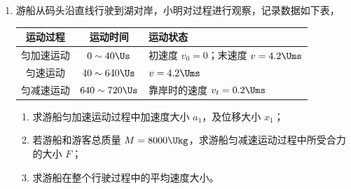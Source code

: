 \documentclass[\gkver]{gaokaozhenti}
\begin{document}
\begin{enumerate}
\item
游船从码头沿直线行驶到湖对岸，小明对过程进行观察，记录数据如下表，

\begin{center}
\begin{tabular}{|c|c|l|}
\hline
运动过程 & 运动时间 & 运动状态 \\
\hline
匀加速运动 & $0\sim40\Us$ & 初速度 $v_0=0$；末速度 $v=4.2\Ums$ \\
\hline
匀速运动 & $40\sim640\Us$ & $v=4.2\Ums$ \\
\hline
匀减速运动 & $640\sim720\Us$ & 靠岸时的速度 $v_t=0.2\Ums$ \\
\hline
\end{tabular}
\end{center}

\begin{enumerate}
	\item
	求游船匀加速运动过程中加速度大小 $a_{1}$，及位移大小 $x_{1}$；
	\item
	若游船和游客总质量 $M=8000\Ukg$，求游船匀减速运动过程中所受合力的大小 $F$；
	\item
	求游船在整个行驶过程中的平均速度大小。
\end{enumerate}


\end{enumerate}
\end{document}
